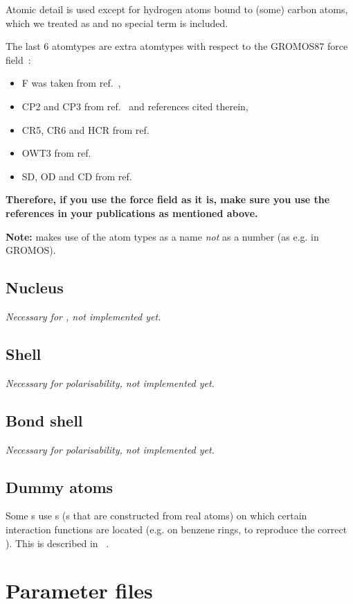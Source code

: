 Atomic detail is used except for hydrogen atoms bound to (some) carbon
atoms, which we treated as {\em {}} and no special
 term is included.

The last 6 atomtypes are extra atomtypes with respect to the GROMOS87
force field~\cite{biomos}: 
\begin{itemize}
\item F was taken from ref.~\cite{Buuren93a}, 
\item CP2 and CP3 from ref.~\cite{Buuren93b} and references cited therein, 
\item CR5, CR6 and HCR from ref.~\cite{King93}
\item OWT3 from ref.~\cite{Jorgensen83}
\item SD, OD and CD from ref.~\cite{Liu95}
\end{itemize}
{\bf Therefore, if you use the {\gromacs} force field as it is, make
sure you use the references in your publications as mentioned above.}

{\bf Note:} {\gromacs} makes use of the atom types as a name {\em
not} as a number (as e.g. in GROMOS).

\subsection{Nucleus}
{\em Necessary for , not implemented yet.}

\subsection{Shell}
{\em Necessary for polarisability, not implemented yet.}

\subsection{Bond shell}
{\em Necessary for polarisability, not implemented yet.}

\subsection{Dummy atoms}
Some s use s 
(s that are constructed
from real atoms) on which certain interaction functions are located
(e.g. on benzene rings, to reproduce the correct
). This is described in ~.

\section{Parameter files}
\label{sec:paramfiles}
